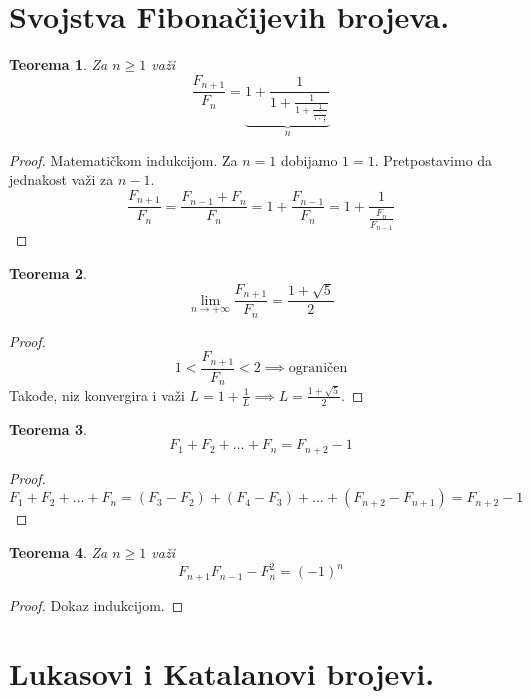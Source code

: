 \documentclass[a4paper,12pt]{article}
\numberwithin{algorithm}{section}
\theoremstyle{plain}
\newtheorem{theorem}{Teorema}[section]
\theoremstyle{definition}
\theoremstyle{remark}
\begin{document}
\section{Svojstva Fibonačijevih brojeva.}
\begin{theorem}
    Za $n \geq 1$ važi
    \[
        \frac{F_{n+1}}{F_n} = \underbrace{1 + \frac{1}{1+\frac{1}{1+\frac{1}{\frac{\ddots}{1+\frac{1}{1}}}}}}_n
    \]
\end{theorem}
\begin{proof}
    Matematičkom indukcijom. Za $n=1$ dobijamo $1=1$. Pretpostavimo da jednakost važi za $n-1$.
    \[\frac{F_{n+1}}{F_n} = \frac{F_{n-1} + F_n}{F_n} = 1 + \frac{F_{n-1}}{F_n} = 1 + \frac{1}{\frac{F_n}{F_{n-1}}}\]
\end{proof}
\begin{theorem}
    \[
        \lim_{n \to +\infty} \frac{F_{n+1}}{F_n} = \frac{1+ \sqrt{5}}{2}
    \]
\end{theorem}
\begin{proof}
    \[
        1 < \frac{F_{n+1}}{F_n} < 2 \implies \text{ograničen}
    \]
    Takođe, niz konvergira i važi $L = 1 + \frac{1}{L} \implies L = \frac{1 + \sqrt{5}}{2}.$
\end{proof}
\begin{theorem}
    \[
        F_1 + F_2 + \dots + F_n = F_{n+2} - 1
    \]
\end{theorem}
\begin{proof}
    \[F_1 + F_2 + \dots + F_n = (F_3 - F_2) + (F_4 - F_3) + \dots + (F_{n+2} - F_{n+1}) = F_{n+2} -1\]
\end{proof}
\begin{theorem}
    Za $n \geq 1$ važi
    \[
        F_{n+1}F_{n-1} - F_{n}^2 = (-1)^n
    \]
\end{theorem}
\begin{proof}
    Dokaz indukcijom.
\end{proof}

\section{Lukasovi i Katalanovi brojevi.}
\end{document}
